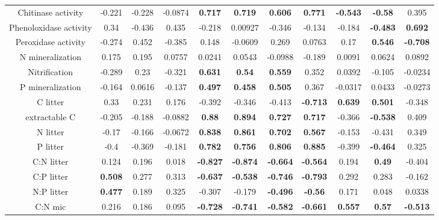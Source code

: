 \documentclass[authoryear,preprint,review,12pt]{elsarticle}
\begin{document}
\begin{table}[h!]
\begin{center}
{\begin{tabular}{ccccccccccc}
  Chitinase activity & -0.221 & -0.228 & -0.0874 & \textbf{ 0.717 } & \textbf{ 0.719 } & \textbf{ 0.606 } & \textbf{ 0.771 } & \textbf{ -0.543 } & \textbf{ -0.58 } & 0.395 \\ 
  Phenoloxidase activity & 0.34 & -0.436 & 0.435 & -0.218 & 0.00927 & -0.346 & -0.134 & -0.184 & \textbf{ -0.483 } & \textbf{ 0.692 } \\ 
  Peroxidase activity & -0.274 & 0.452 & -0.385 & 0.148 & -0.0609 & 0.269 & 0.0763 & 0.17 & \textbf{ 0.546 } & \textbf{ -0.708 } \\ 
  N mineralization & 0.175 & 0.195 & 0.0757 & 0.0241 & 0.0543 & -0.0988 & -0.189 & 0.0091 & 0.0624 & 0.0892 \\ 
  Nitrification & -0.289 & 0.23 & -0.321 & \textbf{ 0.631 } & \textbf{ 0.54 } & \textbf{ 0.559 } & 0.352 & 0.0392 & -0.105 & -0.0234 \\ 
  P mineralization & -0.164 & 0.0616 & -0.137 & \textbf{ 0.497 } & \textbf{ 0.458 } & \textbf{ 0.505 } & 0.367 & -0.0317 & 0.0433 & -0.0273 \\ 
  C litter & 0.33 & 0.231 & 0.176 & -0.392 & -0.346 & -0.413 & \textbf{ -0.713 } & \textbf{ 0.639 } & \textbf{ 0.501 } & -0.348 \\ 
  extractable C & -0.205 & -0.188 & -0.0882 & \textbf{ 0.88 } & \textbf{ 0.894 } & \textbf{ 0.727 } & \textbf{ 0.717 } & -0.366 & \textbf{ -0.538 } & 0.409 \\ 
  N litter & -0.17 & -0.166 & -0.0672 & \textbf{ 0.838 } & \textbf{ 0.861 } & \textbf{ 0.702 } & \textbf{ 0.567 } & -0.153 & -0.431 & 0.349 \\ 
  P litter & -0.4 & -0.369 & -0.181 & \textbf{ 0.782 } & \textbf{ 0.756 } & \textbf{ 0.806 } & \textbf{ 0.885 } & -0.399 & \textbf{ -0.464 } & 0.325 \\ 
  C:N litter & 0.124 & 0.196 & 0.018 & \textbf{ -0.827 } & \textbf{ -0.874 } & \textbf{ -0.664 } & \textbf{ -0.564 } & 0.194 & \textbf{ 0.49 } & -0.404 \\ 
  C:P litter & \textbf{ 0.508 } & 0.277 & 0.313 & \textbf{ -0.637 } & \textbf{ -0.538 } & \textbf{ -0.746 } & \textbf{ -0.793 } & 0.292 & 0.283 & -0.162 \\ 
  N:P litter & \textbf{ 0.477 } & 0.189 & 0.325 & -0.307 & -0.179 & \textbf{ -0.496 } & \textbf{ -0.56 } & 0.171 & 0.048 & 0.0338 \\ 
  C:N mic & 0.216 & 0.186 & 0.095 & \textbf{ -0.728 } & \textbf{ -0.741 } & \textbf{ -0.582 } & \textbf{ -0.661 } & \textbf{ 0.557 } & \textbf{ 0.57 } & \textbf{ -0.513 } \\ 

\end{tabular}}
\end{center}
\end{table}
\end{document}
